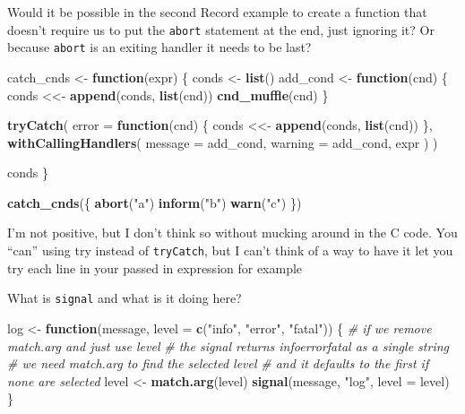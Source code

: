 \documentclass[]{book}
\newenvironment{Shaded}{\begin{snugshade}}{\end{snugshade}}
\newcommand{\CommentTok}[1]{\textcolor[rgb]{0.56,0.35,0.01}{\textit{#1}}}
\newcommand{\ControlFlowTok}[1]{\textcolor[rgb]{0.13,0.29,0.53}{\textbf{#1}}}
\newcommand{\DataTypeTok}[1]{\textcolor[rgb]{0.13,0.29,0.53}{#1}}
\newcommand{\KeywordTok}[1]{\textcolor[rgb]{0.13,0.29,0.53}{\textbf{#1}}}
\newcommand{\NormalTok}[1]{#1}
\newcommand{\StringTok}[1]{\textcolor[rgb]{0.31,0.60,0.02}{#1}}
\begin{document}
Would it be possible in the second Record example to create a function that doesn't require us to put the \texttt{abort} statement at the end, just ignoring it? Or because \texttt{abort} is an exiting handler it needs to be last?

\begin{Shaded}
\begin{Highlighting}[]
\NormalTok{catch_cnds <-}\StringTok{ }\ControlFlowTok{function}\NormalTok{(expr) \{}
\NormalTok{  conds <-}\StringTok{ }\KeywordTok{list}\NormalTok{()}
\NormalTok{  add_cond <-}\StringTok{ }\ControlFlowTok{function}\NormalTok{(cnd) \{}
\NormalTok{    conds <<-}\StringTok{ }\KeywordTok{append}\NormalTok{(conds, }\KeywordTok{list}\NormalTok{(cnd))}
    \KeywordTok{cnd_muffle}\NormalTok{(cnd)}
\NormalTok{  \}}
  
  \KeywordTok{tryCatch}\NormalTok{(}
    \DataTypeTok{error =} \ControlFlowTok{function}\NormalTok{(cnd) \{}
\NormalTok{      conds <<-}\StringTok{ }\KeywordTok{append}\NormalTok{(conds, }\KeywordTok{list}\NormalTok{(cnd))}
\NormalTok{    \},}
    \KeywordTok{withCallingHandlers}\NormalTok{(}
      \DataTypeTok{message =}\NormalTok{ add_cond,}
      \DataTypeTok{warning =}\NormalTok{ add_cond,}
\NormalTok{      expr}
\NormalTok{    )}
\NormalTok{  )}
  
\NormalTok{  conds}
\NormalTok{\}}

\KeywordTok{catch_cnds}\NormalTok{(\{}
  \KeywordTok{abort}\NormalTok{(}\StringTok{"a"}\NormalTok{)}
  \KeywordTok{inform}\NormalTok{(}\StringTok{"b"}\NormalTok{)}
  \KeywordTok{warn}\NormalTok{(}\StringTok{"c"}\NormalTok{)}
\NormalTok{\})}
\end{Highlighting}
\end{Shaded}

I'm not positive, but I don't think so without mucking around in the C code. You ``can'' using try instead of \texttt{tryCatch}, but I can't think of a way to have it let you try each line in your passed in expression for example

What is \texttt{signal} and what is it doing here?

\begin{Shaded}
\begin{Highlighting}[]
\NormalTok{log <-}\StringTok{ }\ControlFlowTok{function}\NormalTok{(message, }\DataTypeTok{level =} \KeywordTok{c}\NormalTok{(}\StringTok{"info"}\NormalTok{, }\StringTok{"error"}\NormalTok{, }\StringTok{"fatal"}\NormalTok{)) \{}
  \CommentTok{# if we remove match.arg and just use level}
  \CommentTok{# the signal returns infoerrorfatal as a single string}
  \CommentTok{# we need match.arg to find the selected level}
  \CommentTok{# and it defaults to the first if none are selected}
\NormalTok{  level <-}\StringTok{ }\KeywordTok{match.arg}\NormalTok{(level)}
  \KeywordTok{signal}\NormalTok{(message, }\StringTok{"log"}\NormalTok{, }\DataTypeTok{level =}\NormalTok{ level)}
\NormalTok{\}}
\end{Highlighting}
\end{Shaded}
\end{document}
